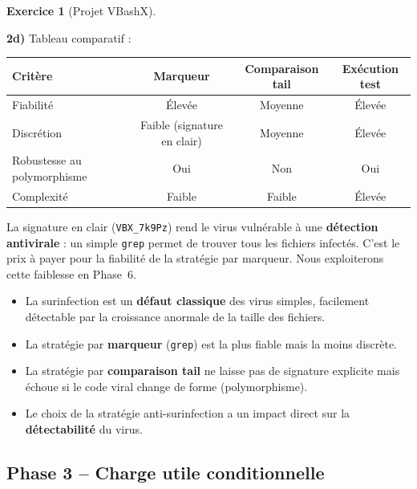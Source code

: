 \documentclass[a4paper,11pt]{article}
\theoremstyle{plain}
\theoremstyle{definition}
\newtheorem{exercice}{Exercice}
\begin{document}
\begin{exercice}[Projet VBashX]
\begin{correction}
\textbf{2d)} Tableau comparatif :
\begin{center}
\begin{tabular}{lccc}
\toprule
\textbf{Critère} & \textbf{Marqueur} & \textbf{Comparaison tail} & \textbf{Exécution test} \\
\midrule
Fiabilité & Élevée & Moyenne & Élevée \\
Discrétion & Faible (signature en clair) & Moyenne & Élevée \\
Robustesse au polymorphisme & Oui & Non & Oui \\
Complexité & Faible & Faible & Élevée \\
\bottomrule
\end{tabular}
\end{center}

\begin{attention}
La signature en clair (\texttt{VBX\_7k9Pz}) rend le virus vulnérable à une \textbf{détection antivirale} : un simple \texttt{grep} permet de trouver tous les fichiers infectés. C'est le prix à payer pour la fiabilité de la stratégie par marqueur. Nous exploiterons cette faiblesse en Phase~6.
\end{attention}

\begin{pointcle}
\begin{itemize}
    \item La surinfection est un \textbf{défaut classique} des virus simples, facilement détectable par la croissance anormale de la taille des fichiers.
    \item La stratégie par \textbf{marqueur} (\texttt{grep}) est la plus fiable mais la moins discrète.
    \item La stratégie par \textbf{comparaison tail} ne laisse pas de signature explicite mais échoue si le code viral change de forme (polymorphisme).
    \item Le choix de la stratégie anti-surinfection a un impact direct sur la \textbf{détectabilité} du virus.
\end{itemize}
\end{pointcle}

\end{correction}



\subsection*{Phase 3 -- Charge utile conditionnelle}


\end{exercice}
\end{document}
